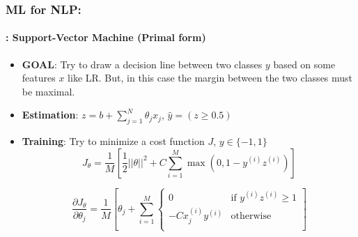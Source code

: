 \documentclass[xcolor=table]{beamer}
\begin{document}
	\begin{frame}
		\frametitle{ML for NLP: \insertsection}
		\framesubtitle{\insertsubsection: Support-Vector Machine (Primal form)}
		
		\begin{minipage}{0.75\textwidth} 
			\begin{itemize}
				\item \textbf{GOAL}: Try to draw a decision line between two classes $ y $ based on some features $ x $ like LR. But, in this case the margin between the two classes must be maximal.
				\item \textbf{Estimation}: $ z = b + \sum_{j=1}^{N} \theta_j x_j $, 
				$ \hat{y} = (z \ge 0.5)$
			\end{itemize}
		\end{minipage}
		\begin{minipage}{0.24\textwidth} 
		\end{minipage}
		
		\begin{itemize}
			\item \textbf{Training}: Try to minimize a cost function $ J $, $ y \in \{-1, 1\} $
			\[J_\theta = \frac{1}{M} \left[ \frac{1}{2}||\theta||^2 + C \sum\limits_{i=1}^{M} \max (0, 1 - y^{(i)} z^{(i)}) \right]
			\]
			
			\[\frac{\partial J_\theta}{\partial \theta_{j}} = \frac{1}{M} \left[ \theta_j + \sum\limits_{i=1}^{M} \begin{cases}
				0 & \text{if } y^{(i)} z^{(i)} \ge 1\\
				- C x^{(i)}_j y^{(i)} & \text{otherwise}  \\
			\end{cases} \right]
			\]
		\end{itemize}
		
	\end{frame}
	
\end{document}
